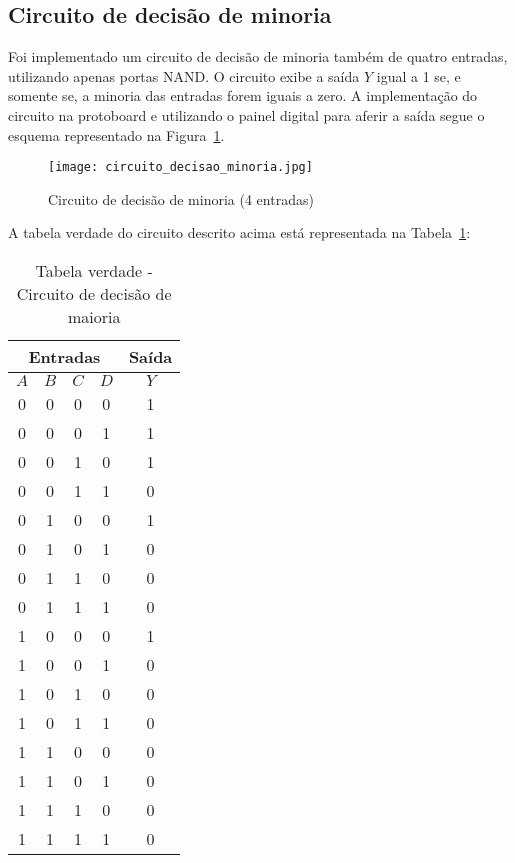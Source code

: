 \documentclass[12pt]{article}
\begin{document}
\subsection{Circuito de decisão de minoria}
\label{sec:CMinoria}

Foi implementado um circuito de decisão de minoria também de quatro entradas, utilizando apenas portas NAND. O circuito exibe a saída $Y$ igual a 1 se, e somente se, a minoria das entradas forem iguais a zero. A implementação do circuito na protoboard e utilizando o painel digital para aferir a saída segue o esquema representado na Figura~\ref{fig:circ_minoria}.

\begin{figure}[H]
    \centering
    \texttt{[image: circuito\_decisao\_minoria.jpg]}
    \caption{Circuito de decisão de minoria (4 entradas)}
    \label{fig:circ_minoria}
\end{figure}

A tabela verdade do circuito descrito acima está representada na Tabela~\ref{tab:circ_minoria}:

\begin{table}[H]
    \centering
    \caption{Tabela verdade - Circuito de decisão de maioria}

    \begin{tabular}{|c|c|c|c|c|}
    \hline
    \multicolumn{4}{c}{Entradas} & \multicolumn{1}{|c|}{Saída}\\
    \hline
    $A$ & $B$ & $C$ & $D$ & $Y$\\
    \hline
    0 & 0 & 0 & 0 & 1\\
    \hline
    0 & 0 & 0 & 1 & 1\\
    \hline
    0 & 0 & 1 & 0 & 1\\
    \hline
    0 & 0 & 1 & 1 & 0\\
    \hline
    0 & 1 & 0 & 0 & 1\\
    \hline
    0 & 1 & 0 & 1 & 0\\
    \hline
    0 & 1 & 1 & 0 & 0\\
    \hline
    0 & 1 & 1 & 1 & 0\\
    \hline
    1 & 0 & 0 & 0 & 1\\
    \hline
    1 & 0 & 0 & 1 & 0\\
    \hline
    1 & 0 & 1 & 0 & 0\\
    \hline
    1 & 0 & 1 & 1 & 0\\
    \hline
    1 & 1 & 0 & 0 & 0\\
    \hline
    1 & 1 & 0 & 1 & 0\\
    \hline
    1 & 1 & 1 & 0 & 0\\
    \hline
    1 & 1 & 1 & 1 & 0\\
    \hline
    \end{tabular}
    \label{tab:circ_minoria}
\end{table}
\end{document}
